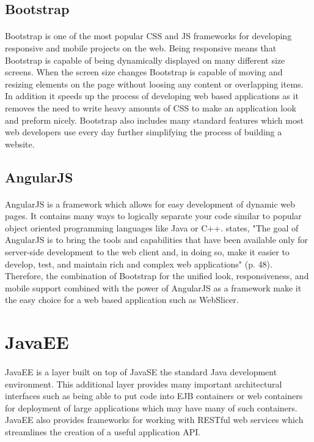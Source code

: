 \subsection{Bootstrap}
\paragraph{}
Bootstrap is one of the most popular CSS and JS frameworks for developing responsive and mobile projects on the web.
Being responsive means that Bootstrap is capable of being dynamically displayed on many different size screens.
When the screen size changes Bootstrap is capable of moving and resizing elements on the page without loosing any content or overlapping items.
In addition it speeds up the process of developing web based applications as it removes the need to write heavy amounts of CSS to make an application look and preform nicely.
Bootstrap also includes many standard features which most web developers use every day further simplifying the process of building a website.

\subsection{AngularJS}
\paragraph{}
AngularJS is a framework which allows for easy development of dynamic web pages.
It contains many ways to logically separate your code similar to popular object oriented programming languages like Java or C++.
\citet{freeman-2014} states, "The goal of AngularJS is to bring the tools and capabilities that have been available only for server-side development to the web client and, in doing so, make it easier to develop, test, and maintain rich and complex web applications" (p. 48).
Therefore, the combination of Bootstrap for the unified look, responsiveness, and mobile support combined with the power of AngularJS as a framework make it the easy choice for a web based application such as WebSlicer.

\section{JavaEE}
\paragraph{}
JavaEE is a layer built on top of JavaSE the standard Java development environment.
This additional layer provides many important architectural interfaces such as being able to put code into EJB containers or web containers for deployment of large applications which may have many of such containers. \cite{pilgrim-2013}
JavaEE also provides frameworks for working with RESTful web services which streamlines the creation of a useful application API.

